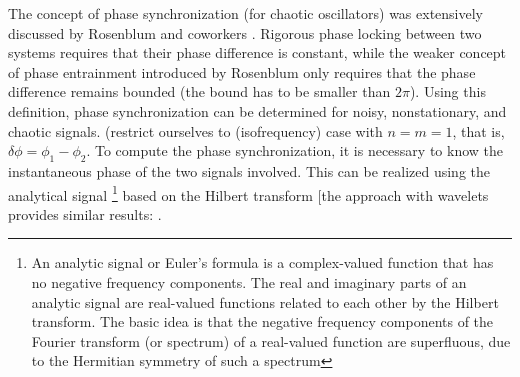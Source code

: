 \documentclass[11pt, onecolumn]{article}
\begin{document}
The concept of phase synchronization (for chaotic oscillators) was extensively discussed by Rosenblum and coworkers \citep{rosenblum1996phase}. Rigorous phase locking between two systems requires that their phase difference is constant, while the weaker concept of phase entrainment introduced by Rosenblum only requires that the phase difference remains bounded (the bound has to be smaller than $2\pi$). Using this definition, phase synchronization can be determined for noisy, nonstationary, and chaotic signals. (restrict ourselves to (isofrequency) case with $n = m = 1$, that is, $\delta \phi = \phi_1 - \phi_2$. To compute the phase synchronization, it is necessary to know the instantaneous phase of the two signals involved. This can be realized using the analytical signal \footnote{An analytic signal or Euler's formula  is a complex-valued function that has no negative frequency components. The real and imaginary parts of an analytic signal are real-valued functions related to each other by the Hilbert transform. The basic idea is that the negative frequency components of the Fourier transform (or spectrum) of a real-valued function are superfluous, due to the Hermitian symmetry of such a spectrum} based on the Hilbert transform [the approach with wavelets provides similar results: \citep{bruns2004fourier}.
\end{document}
